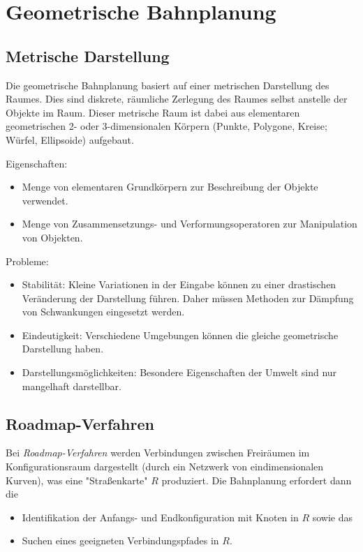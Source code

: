 	\section{Geometrische Bahnplanung}
		\subsection{Metrische Darstellung}
			Die geometrische Bahnplanung basiert auf einer metrischen Darstellung des Raumes. Dies sind diskrete, räumliche Zerlegung des Raumes selbst anstelle der Objekte im Raum. Dieser metrische Raum ist dabei aus elementaren geometrischen 2- oder 3-dimensionalen Körpern (Punkte, Polygone, Kreise; Würfel, Ellipsoide) aufgebaut.
			
			Eigenschaften:
			\begin{itemize}
				\item Menge von elementaren Grundkörpern zur Beschreibung der Objekte verwendet.
				\item Menge von Zusammensetzungs- und Verformungsoperatoren zur Manipulation von Objekten.
			\end{itemize}
		
			Probleme:
			\begin{itemize}
				\item Stabilität: Kleine Variationen in der Eingabe können zu einer drastischen Veränderung der Darstellung führen. Daher müssen Methoden zur Dämpfung von Schwankungen eingesetzt werden.
				\item Eindeutigkeit: Verschiedene Umgebungen können die gleiche geometrische Darstellung haben.
				\item Darstellungsmöglichkeiten: Besondere Eigenschaften der Umwelt sind \mglw nur mangelhaft darstellbar.
			\end{itemize}

		\subsection{Roadmap-Verfahren} 
			Bei \emph{Roadmap-Verfahren} werden Verbindungen zwischen Freiräumen im Konfigurationsraum dargestellt (durch ein Netzwerk von eindimensionalen Kurven), was eine "Straßenkarte" \(R\) produziert. Die Bahnplanung erfordert dann die
			\begin{itemize}
				\item Identifikation der Anfangs- und Endkonfiguration mit Knoten in \(R\) sowie das
				\item Suchen eines geeigneten Verbindungspfades in \(R\).
			\end{itemize}
			
